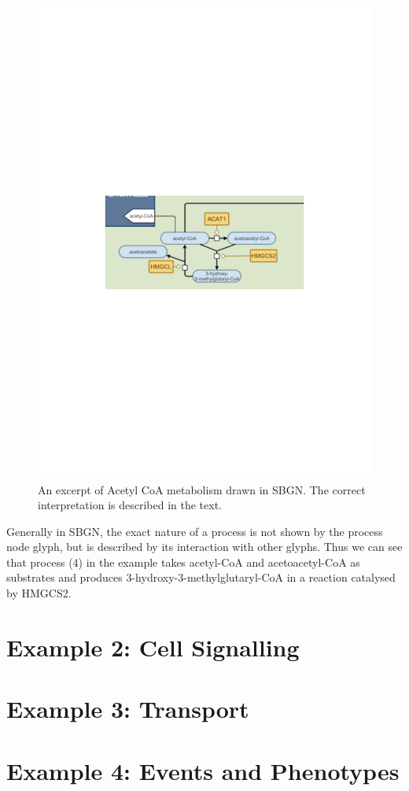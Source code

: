 \begin{figure}[htb]
\includegraphics[width=\linewidth,clip,trim=5cm 12cm 5cm 12.5cm]{worked_example_ideas/example1_1}
\caption{An excerpt of Acetyl CoA metabolism drawn in SBGN. The
  correct interpretation is described in the text.}
\label{fig:weg1}
\end{figure}

 Generally in SBGN, the exact nature of a process is not shown by the
process node glyph, but is described by its interaction with other
glyphs. Thus we can see that process (4) in the example takes
acetyl-CoA and acetoacetyl-CoA as substrates and produces
3-hydroxy-3-methylglutaryl-CoA in a reaction catalysed by HMGCS2.


\section{Example 2: Cell Signalling}



\section{Example 3: Transport}


\section{Example 4: Events and Phenotypes}

